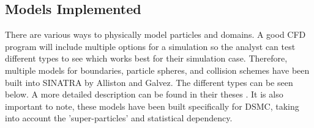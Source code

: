 \subsection{Models Implemented}
\label{sec:models}

There are various ways to physically model particles and domains. A good CFD program will include multiple options for a simulation so the analyst can test different types to see which works best for their simulation case. Therefore, multiple models for boundaries, particle spheres, and collision schemes have been built into SINATRA by Alliston and Galvez. The different types can be seen below. A more detailed description can be found in their theses \cite{Galvez2018a} \cite{mac_thesis}. It is also important to note, these models have been built specifically for DSMC, taking into account the 'super-particles' and statistical dependency. 

